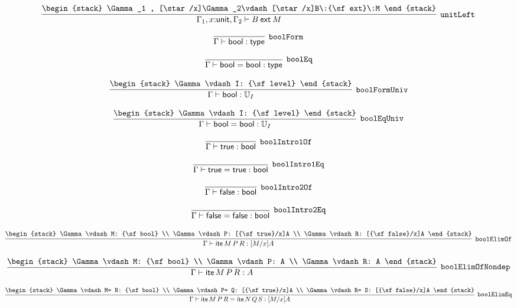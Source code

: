 \[
\infer[{\tt unitLeft}]{\Gamma_1 ,x\mathord{:}{\sf unit}, \Gamma_2 \vdash B\:{\sf ext}\:M}{
\begin{stack}
\Gamma_1 , [\star /x]\Gamma_2\vdash [\star /x]B\:{\sf ext}\:M
\end{stack}}
\]

\[
\infer[{\tt boolForm}]{\Gamma \vdash {\sf bool}: {\sf type}}{}
\]

\[
\infer[{\tt boolEq}]{\Gamma \vdash {\sf bool}= {\sf bool}: {\sf type}}{}
\]

\[
\infer[{\tt boolFormUniv}]{\Gamma \vdash {\sf bool}: {\Bbb U}_{I}}{
\begin{stack}
\Gamma \vdash I: {\sf level}
\end{stack}}
\]

\[
\infer[{\tt boolEqUniv}]{\Gamma \vdash {\sf bool}= {\sf bool}: {\Bbb U}_{I}}{
\begin{stack}
\Gamma \vdash I: {\sf level}
\end{stack}}
\]

\[
\infer[{\tt boolIntro1Of}]{\Gamma \vdash {\sf true}: {\sf bool}}{}
\]

\[
\infer[{\tt boolIntro1Eq}]{\Gamma \vdash {\sf true}= {\sf true}: {\sf bool}}{}
\]

\[
\infer[{\tt boolIntro2Of}]{\Gamma \vdash {\sf false}: {\sf bool}}{}
\]

\[
\infer[{\tt boolIntro2Eq}]{\Gamma \vdash {\sf false}= {\sf false}: {\sf bool}}{}
\]

\[
\infer[{\tt boolElimOf}]{\Gamma \vdash {\sf ite}\,M\,P\,R: [M/x]A}{
\begin{stack}
\Gamma \vdash M: {\sf bool}
\\
\Gamma \vdash P: [{\sf true}/x]A
\\
\Gamma \vdash R: [{\sf false}/x]A
\end{stack}}
\]

\[
\infer[{\tt boolElimOfNondep}]{\Gamma \vdash {\sf ite}\,M\,P\,R: A}{
\begin{stack}
\Gamma \vdash M: {\sf bool}
\\
\Gamma \vdash P: A
\\
\Gamma \vdash R: A
\end{stack}}
\]

\[
\infer[{\tt boolElimEq}]{\Gamma \vdash {\sf ite}\,M\,P\,R= {\sf ite}\,N\,Q\,S: [M/x]A}{
\begin{stack}
\Gamma \vdash M= N: {\sf bool}
\\
\Gamma \vdash P= Q: [{\sf true}/x]A
\\
\Gamma \vdash R= S: [{\sf false}/x]A
\end{stack}}
\]


